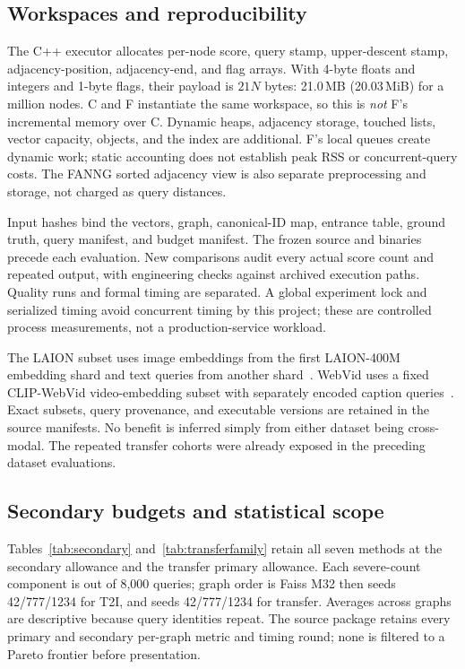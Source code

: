 \subsection{Workspaces and reproducibility}\label{app:repro}
The C++ executor allocates per-node score, query stamp, upper-descent stamp, adjacency-position, adjacency-end, and flag arrays. With 4-byte floats and integers and 1-byte flags, their payload is $21N$ bytes: 21.0\,MB (20.03\,MiB) for a million nodes. C and F instantiate the same workspace, so this is \emph{not} F's incremental memory over C. Dynamic heaps, adjacency storage, touched lists, vector capacity, objects, and the index are additional. F's local queues create dynamic work; static accounting does not establish peak RSS or concurrent-query costs. The FANNG sorted adjacency view is also separate preprocessing and storage, not charged as query distances.

Input hashes bind the vectors, graph, canonical-ID map, entrance table, ground truth, query manifest, and budget manifest. The frozen source and binaries precede each evaluation. New comparisons audit every actual score count and repeated output, with engineering checks against archived execution paths. Quality runs and formal timing are separated. A global experiment lock and serialized timing avoid concurrent timing by this project; these are controlled process measurements, not a production-service workload.

The LAION subset uses image embeddings from the first LAION-400M embedding shard and text queries from another shard~\cite{laionembeddings}. WebVid uses a fixed CLIP-WebVid video-embedding subset with separately encoded caption queries~\cite{clipwebvid,clip}. Exact subsets, query provenance, and executable versions are retained in the source manifests. No benefit is inferred simply from either dataset being cross-modal. The repeated transfer cohorts were already exposed in the preceding dataset evaluations.

\subsection{Secondary budgets and statistical scope}\label{app:secondary}
Tables~\ref{tab:secondary} and~\ref{tab:transferfamily} retain all seven methods at the secondary allowance and the transfer primary allowance. Each severe-count component is out of 8,000 queries; graph order is Faiss M32 then seeds 42/777/1234 for T2I, and seeds 42/777/1234 for transfer. Averages across graphs are descriptive because query identities repeat. The source package retains every primary and secondary per-graph metric and timing round; none is filtered to a Pareto frontier before presentation.

